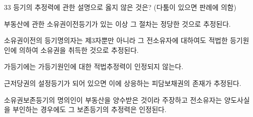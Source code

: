 \begin{question}{33}
등기의 추정력에 관한 설명으로 옳지 않은 것은? (다툼이 있으면 판례에 의함)
\begin{choices}
  \item 부동산에 관한 소유권이전등기가 있는 이상 그 절차는 정당한 것으로 추정된다.
  \item 소유권이전의 등기명의자는 제3자뿐만 아니라 그 전소유자에 대하여도 적법한 등기원인에 의하여 소유권을 취득한 것으로 추정된다.
  \item 가등기에는 가등기원인에 대한 적법추정력이 인정되지 않는다.
  \item 근저당권의 설정등기가 되어 있으면 이에 상응하는 피담보채권의 존재가 추정된다.
  \item 소유권보존등기의 명의인이 부동산을 양수받은 것이라 주장하고 전소유자는 양도사실을 부인하는 경우에도 그 보존등기의 추정력은 인정된다.
\end{choices}
\end{question}
